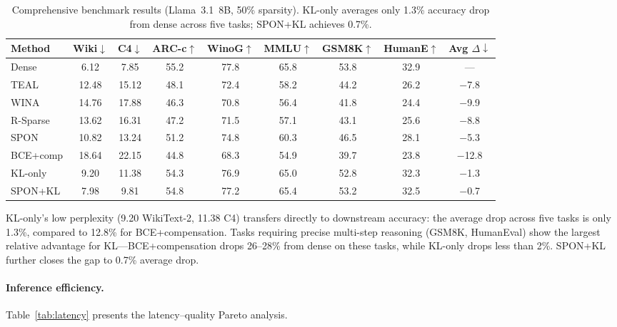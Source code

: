 \documentclass[11pt,a4paper]{article}
\begin{document}
\begin{table}[t]
\centering
\small
\caption{Comprehensive benchmark results (Llama~3.1~8B, 50\% sparsity). KL-only averages only 1.3\% accuracy drop from dense across five tasks; SPON+KL achieves 0.7\%.}
\label{tab:fullbench}
\begin{tabular}{lcccccccc}
\toprule
\textbf{Method} & \textbf{Wiki$\downarrow$} & \textbf{C4$\downarrow$} & \textbf{ARC-c$\uparrow$} & \textbf{WinoG$\uparrow$} & \textbf{MMLU$\uparrow$} & \textbf{GSM8K$\uparrow$} & \textbf{HumanE$\uparrow$} & \textbf{Avg $\Delta\downarrow$} \\
\midrule
Dense & 6.12 & 7.85 & 55.2 & 77.8 & 65.8 & 53.8 & 32.9 & --- \\
TEAL & 12.48 & 15.12 & 48.1 & 72.4 & 58.2 & 44.2 & 26.2 & $-$7.8 \\
WINA & 14.76 & 17.88 & 46.3 & 70.8 & 56.4 & 41.8 & 24.4 & $-$9.9 \\
R-Sparse & 13.62 & 16.31 & 47.2 & 71.5 & 57.1 & 43.1 & 25.6 & $-$8.8 \\
SPON & 10.82 & 13.24 & 51.2 & 74.8 & 60.3 & 46.5 & 28.1 & $-$5.3 \\
BCE+comp & 18.64 & 22.15 & 44.8 & 68.3 & 54.9 & 39.7 & 23.8 & $-$12.8 \\
KL-only & 9.20 & 11.38 & 54.3 & 76.9 & 65.0 & 52.8 & 32.3 & $-$1.3 \\
SPON+KL & 7.98 & 9.81 & 54.8 & 77.2 & 65.4 & 53.2 & 32.5 & $-$0.7 \\
\bottomrule
\end{tabular}
\end{table}

KL-only's low perplexity (9.20 WikiText-2, 11.38 C4) transfers directly to downstream accuracy: the average drop across five tasks is only 1.3\%, compared to 12.8\% for BCE+compensation.
Tasks requiring precise multi-step reasoning (GSM8K, HumanEval) show the largest relative advantage for KL---BCE+compensation drops 26--28\% from dense on these tasks, while KL-only drops less than 2\%.
SPON+KL further closes the gap to 0.7\% average drop.

\paragraph{Inference efficiency.}
Table~\ref{tab:latency} presents the latency--quality Pareto analysis.
\end{document}
